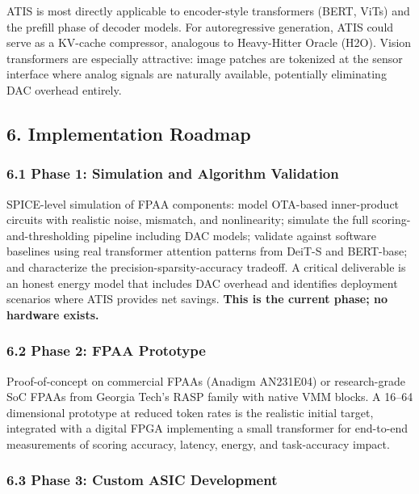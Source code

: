 ATIS is most directly applicable to encoder-style transformers (BERT,
ViTs) and the prefill phase of decoder models. For autoregressive
generation, ATIS could serve as a KV-cache compressor, analogous to
Heavy-Hitter Oracle (H2O). Vision transformers are especially
attractive: image patches are tokenized at the sensor interface where
analog signals are naturally available, potentially eliminating DAC
overhead entirely.

\subsection{6. Implementation Roadmap}\label{implementation-roadmap}

\subsubsection{6.1 Phase 1: Simulation and Algorithm
Validation}\label{phase-1-simulation-and-algorithm-validation}

SPICE-level simulation of FPAA components: model OTA-based inner-product
circuits with realistic noise, mismatch, and nonlinearity; simulate the
full scoring-and-thresholding pipeline including DAC models; validate
against software baselines using real transformer attention patterns
from DeiT-S and BERT-base; and characterize the
precision-sparsity-accuracy tradeoff. A critical deliverable is an
honest energy model that includes DAC overhead and identifies deployment
scenarios where ATIS provides net savings. \textbf{This is the current
phase; no hardware exists.}

\subsubsection{6.2 Phase 2: FPAA
Prototype}\label{phase-2-fpaa-prototype}

Proof-of-concept on commercial FPAAs (Anadigm AN231E04) or
research-grade SoC FPAAs from Georgia Tech's RASP family with native VMM
blocks. A 16--64 dimensional prototype at reduced token rates is the
realistic initial target, integrated with a digital FPGA implementing a
small transformer for end-to-end measurements of scoring accuracy,
latency, energy, and task-accuracy impact.

\subsubsection{6.3 Phase 3: Custom ASIC
Development}\label{phase-3-custom-asic-development}

